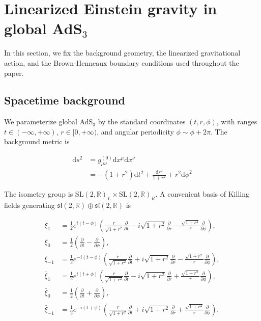 \section{\texorpdfstring{Linearized Einstein gravity in global AdS\(_3\)}{Linearized Einstein gravity in global AdS\_3}}\label{linearized-einstein-gravity-in-global-ads_3}

In this section, we fix the background geometry, the linearized gravitational action, and the Brown-Henneaux boundary conditions used throughout the paper.

\subsection{Spacetime background}\label{spacetime-background}

We parameterize global AdS\(_3\) by the standard coordinates \((t,r,\phi)\), with ranges \(t\in(-\infty,+\infty)\), \(r\in[0,+\infty)\), and angular periodicity \(\phi \sim \phi+2\pi\). The background metric is

\begin{align}
\mathrm{d}s^{2} & =g^{(0)}_{\mu \nu}\mathrm{d}x^{\mu}\mathrm{d}x^{\nu} \\
 & =-(1+r^2)\mathrm{d}t^2+\frac{\mathrm{d}r^2}{1+r^2}+r^2\mathrm{d}\phi^2
\end{align}

The isometry group is \(\mathrm{SL}(2,\mathbb{R})_L\times \mathrm{SL}(2,\mathbb{R})_R\). A convenient basis of Killing fields generating \(\mathfrak{sl}(2,\mathbb{R})\oplus \mathfrak{sl}(2,\mathbb{R})\) is

\begin{align}
\xi _{1} & =\frac{1}{2}e^{i(t-\phi)}\left(\frac{r}{\sqrt{1+r^2}}\frac{\partial}{\partial t}-i\sqrt{1+r^2}\frac{\partial}{\partial r}-\frac{\sqrt{1+r^2}}{r}\frac{\partial}{\partial \phi}\right),\\
\xi _{0} & =\frac{1}{2}\left(\frac{\partial}{\partial t}-\frac{\partial}{\partial \phi}\right),\\
\xi _{-1} & =\frac{1}{2}e^{-i(t-\phi)}\left(\frac{r}{\sqrt{1+r^2}}\frac{\partial}{\partial t}+i\sqrt{1+r^2}\frac{\partial}{\partial r}-\frac{\sqrt{1+r^2}}{r}\frac{\partial}{\partial \phi}\right),\\
\bar{\xi}_{1} & =\frac{1}{2}e^{i(t+\phi)}\left(\frac{r}{\sqrt{1+r^2}}\frac{\partial}{\partial t}-i\sqrt{1+r^2}\frac{\partial}{\partial r}+\frac{\sqrt{1+r^2}}{r}\frac{\partial}{\partial \phi}\right),\\
\bar{\xi}_{0} & =\frac{1}{2}\left(\frac{\partial}{\partial t}+\frac{\partial}{\partial \phi}\right),\\
\bar{\xi}_{-1} & =\frac{1}{2}e^{-i(t+\phi)}\left(\frac{r}{\sqrt{1+r^2}}\frac{\partial}{\partial t}+i\sqrt{1+r^2}\frac{\partial}{\partial r}+\frac{\sqrt{1+r^2}}{r}\frac{\partial}{\partial \phi}\right).
\end{align}


